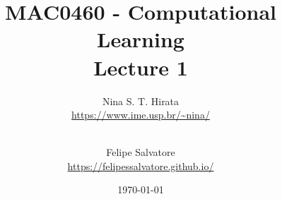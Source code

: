 \title{MAC0460 - Computational Learning \\ Lecture 1} 
\date{\today}

\author{
  Nina S. T. Hirata\\
  \url{https://www.ime.usp.br/~nina/}
  \vspace{0.4 cm}
  \and\\ 
  Felipe Salvatore\\
  \url{https://felipessalvatore.github.io/}\vspace{0.4 cm}
}



